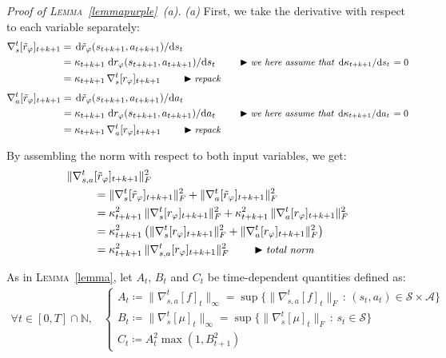 \emph{Proof of \textsc{Lemma}~\ref{lemmapurple}~\emph{(a)}.}
\emph{(a)} First, we take the derivative with respect to each variable separately:
\begin{align}
\nabla_s^t[\tilde{r}_\varphi]_{t+k+1}
&= \dv*{\tilde{r}_\varphi (s_{t+k+1}, a_{t+k+1})}{s_t} \\
&= \kappa_{t+k+1} \dv*{r_\varphi (s_{t+k+1}, a_{t+k+1})}{s_t}
\qquad
\blacktriangleright\text{\small{\textit{we here assume that $\dv*{\kappa_{t+k+1}}{s_t} = 0$}}} \\
&= \kappa_{t+k+1} \, \nabla_s^t[r_\varphi]_{t+k+1}
\qquad
\blacktriangleright\text{\small{\textit{repack}}}
\end{align}
\begin{align}
\nabla_a^t[\tilde{r}_\varphi]_{t+k+1}
&= \dv*{\tilde{r}_\varphi (s_{t+k+1}, a_{t+k+1})}{a_t} \\
&= \kappa_{t+k+1} \dv*{r_\varphi (s_{t+k+1}, a_{t+k+1})}{a_t}
\qquad
\blacktriangleright\text{\small{\textit{we here assume that $\dv*{\kappa_{t+k+1}}{a_t} = 0$}}} \\
&= \kappa_{t+k+1} \, \nabla_a^t[r_\varphi]_{t+k+1}
\qquad
\blacktriangleright\text{\small{\textit{repack}}}
\end{align}

By assembling the norm with respect to both input variables, we get:
\begin{align}
\lVert \nabla_{s,a}^t&[\tilde{r}_\varphi]_{t+k+1} \rVert ^2_F \nonumber \\
&= \lVert \nabla_s^t[\tilde{r}_\varphi]_{t+k+1} \rVert ^2_F
+ \lVert \nabla_a^t[\tilde{r}_\varphi]_{t+k+1} \rVert ^2_F \\
&= \kappa_{t+k+1}^2 \, \lVert \nabla_s^t[r_\varphi]_{t+k+1} \rVert ^2_F
+ \kappa_{t+k+1}^2 \, \lVert \nabla_a^t[r_\varphi]_{t+k+1} \rVert ^2_F \\
&= \kappa_{t+k+1}^2 \, \big(\lVert \nabla_s^t[r_\varphi]_{t+k+1} \rVert ^2_F
+ \lVert \nabla_a^t[r_\varphi]_{t+k+1} \rVert ^2_F\big) \\
&=
\kappa_{t+k+1}^2 \, \lVert \nabla_{s,a}^t[r_\varphi]_{t+k+1} \rVert ^2_F
\qquad
\blacktriangleright\text{\small{\textit{total norm}}}
\end{align}

As in \textsc{Lemma}~\ref{lemma}, let $A_t$, $B_t$ and $C_t$ be time-dependent quantities defined as:
\begin{align}
\forall t \in [0, T] \cap \mathbb{N} \text{,} \quad
\begin{cases}
A_t \coloneqq \lVert\nabla_{s,a}^t[f]_t\rVert _\infty
= \sup \big\{\lVert\nabla_{s,a}^t[f]_t\rVert _F \, : \, (s_t, a_t) \in
\mathcal{S} \times \mathcal{A} \big\} \\
B_t \coloneqq \lVert\nabla_s^t[\mu]_t\rVert _\infty
= \sup \big\{\lVert\nabla_s^t[\mu]_t\rVert _F \, : \, s_t \in
\mathcal{S} \big\} \\
C_t \coloneqq A_t^2 \max(1, B_{t+1}^2)
\end{cases}
\label{aandbpurple}
\end{align}

